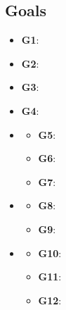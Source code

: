 \subsection{Goals}

\newcommand{\GI}{\textbf{G1}: }

\newcommand{\GII}{\textbf{G2}: }

\newcommand{\GIII}{\textbf{G3}: }

\newcommand{\GIV}{\textbf{G4}: }

\newcommand{\GV}{\textbf{G5}: }

\newcommand{\GVI}{\textbf{G6}: }

\newcommand{\GVII}{\textbf{G7}: }

\newcommand{\GVIII}{\textbf{G8}: }

\newcommand{\GIX}{\textbf{G9}: }

\newcommand{\GX}{\textbf{G10}: }

\newcommand{\GXI}{\textbf{G11}: }

\newcommand{\GXII}{\textbf{G12}: }



\begin{itemize}
	\item \GI
	\item \GII
	\item \GIII
	\item \GIV
	\item \textit{}
		\begin{itemize}
		\item \GV
		\item \GVI
		\item \GVII
		\end{itemize}
	\item \textit{}
		\begin{itemize}
		\item \GVIII
		\item \GIX
		\end{itemize}
	\item \textit{}
		\begin{itemize}
		\item \GX
		\item \GXI
		\item \GXII
		\end{itemize}
\end{itemize}
 